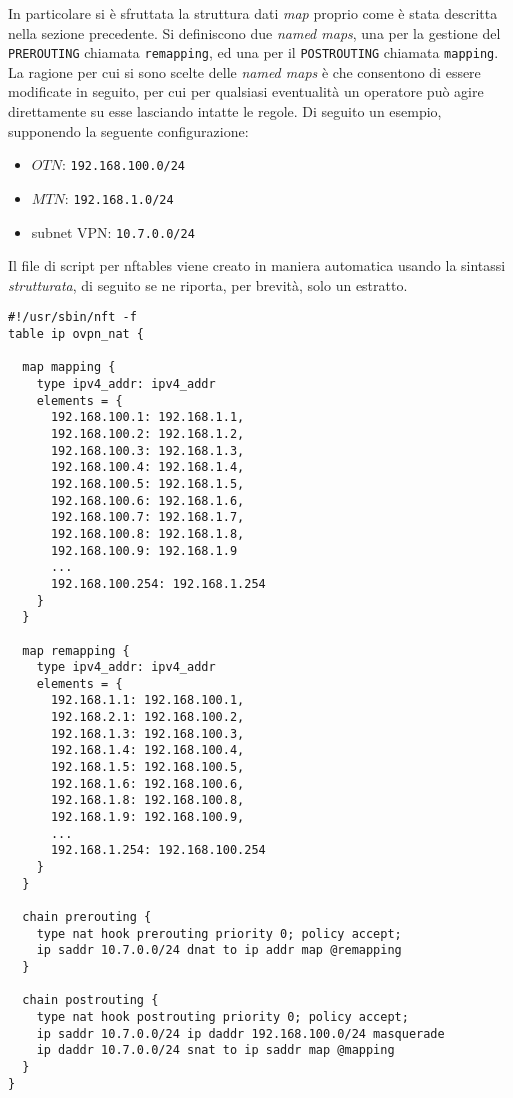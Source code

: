 In particolare si è sfruttata la struttura dati \textit{map} proprio come è stata
descritta nella sezione precedente. Si definiscono due \textit{named maps},
una per la gestione
del \texttt{PREROUTING} chiamata \texttt{remapping}, ed una per il \texttt{POSTROUTING}
chiamata \texttt{mapping}. La ragione per cui si sono scelte delle \textit{named maps}
è che consentono di essere modificate in seguito, per cui per qualsiasi eventualità
un operatore può agire direttamente su esse lasciando intatte le regole.
Di seguito un esempio, supponendo la seguente configurazione:
\begin{itemize}
  \item $OTN$: \texttt{192.168.100.0/24}
  \item $MTN$: \texttt{192.168.1.0/24}
  \item subnet VPN: \texttt{10.7.0.0/24}
\end{itemize}
Il file di script per nftables viene creato in maniera automatica usando la sintassi
\textit{strutturata},
di seguito se ne riporta, per brevità, solo un estratto.
\begin{verbatim}
#!/usr/sbin/nft -f
table ip ovpn_nat {

  map mapping {
    type ipv4_addr: ipv4_addr
    elements = {
      192.168.100.1: 192.168.1.1,
      192.168.100.2: 192.168.1.2,
      192.168.100.3: 192.168.1.3,
      192.168.100.4: 192.168.1.4,
      192.168.100.5: 192.168.1.5,
      192.168.100.6: 192.168.1.6,
      192.168.100.7: 192.168.1.7,
      192.168.100.8: 192.168.1.8,
      192.168.100.9: 192.168.1.9
      ...
      192.168.100.254: 192.168.1.254   
    }
  }

  map remapping {
    type ipv4_addr: ipv4_addr
    elements = {
      192.168.1.1: 192.168.100.1,
      192.168.2.1: 192.168.100.2,
      192.168.1.3: 192.168.100.3,
      192.168.1.4: 192.168.100.4,
      192.168.1.5: 192.168.100.5,
      192.168.1.6: 192.168.100.6,
      192.168.1.8: 192.168.100.8,
      192.168.1.9: 192.168.100.9,
      ...
      192.168.1.254: 192.168.100.254
    }
  }

  chain prerouting {
    type nat hook prerouting priority 0; policy accept;
    ip saddr 10.7.0.0/24 dnat to ip addr map @remapping
  }

  chain postrouting {
    type nat hook postrouting priority 0; policy accept;
    ip saddr 10.7.0.0/24 ip daddr 192.168.100.0/24 masquerade
    ip daddr 10.7.0.0/24 snat to ip saddr map @mapping
  }
}
\end{verbatim}
